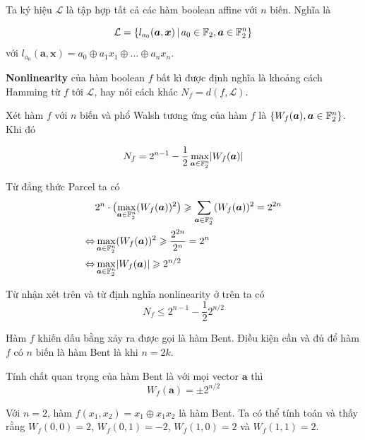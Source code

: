 Ta ký hiệu $\mathcal{L}$ là tập hợp tất cả các hàm boolean affine với $n$ biến. Nghĩa là

\begin{equation}
	\mathcal{L} = \{ l_{a_0} (\bm{a}, \bm{x}) \, | \, a_0 \in \mathbb{F}_2, \bm{a} \in \mathbb{F}_2^n \}
\end{equation}
với $l_{a_0} (\bm{a}, \bm{x}) = a_0 \oplus a_1 x_1 \oplus \ldots \oplus a_n x_n$.

\begin{definition}
	\textbf{Nonlinearity} của hàm boolean $f$ bất kì được định nghĩa là khoảng cách Hamming từ $f$ tới $\mathcal{L}$, hay nói cách khác $N_f = d(f, \mathcal{L})$.
\end{definition}

\begin{remark}
	Xét hàm $f$ với $n$ biến và phổ Walsh tương ứng của hàm $f$ là $\{ W_f (\bm{a}), \bm{a} \in \mathbb{F}_2^n \}$. Khi đó 
	
	\begin{equation}\label{walsh:eq3}
		N_f = 2^{n-1} - \frac{1}{2} \max_{\bm{a} \in \mathbb{F}_2^n} \lvert W_f (\bm{a}) \rvert
	\end{equation}
\end{remark}

\begin{remark}
	Từ đẳng thức Parcel ta có 
	\begin{align*}
		& 2^n \cdot \bigl(\max_{\bm{a} \in \mathbb{F}_2^n} (W_f (\bm{a}))^2\bigr) \geqslant \sum_{\bm{a} \in \mathbb{F}_2^n} (W_f (\bm{a}))^2 = 2^{2n} \\ \Leftrightarrow & \max_{\bm{a} \in \mathbb{F}_2^n} (W_f (\bm{a}))^2 \geqslant \frac{2^{2n}}{2^n} = 2^n \\ \Leftrightarrow & \max_{\bm{a} \in \mathbb{F}_2^n} \lvert W_f (\bm{a}) \rvert \geqslant 2^{n/2}
	\end{align*}
\end{remark}

Từ nhận xét trên và từ định nghĩa nonlinearity ở trên ta có \[N_f \leqslant 2^{n-1} - \frac{1}{2} 2^{n / 2} \]

Hàm $f$ khiến dấu bằng xảy ra được gọi là hàm Bent. Điều kiện cần và đủ để hàm $f$ có $n$ biến là hàm Bent là khi $n = 2k$.

Tính chất quan trọng của hàm Bent là với mọi vector $\bm{a}$ thì \[W_f (\bm{a}) = \pm 2^{n/2}\]

\begin{example}
	Với $n = 2$, hàm $f(x_1, x_2) = x_1 \oplus x_1 x_2$ là hàm Bent. Ta có thể tính toán và thấy rằng $W_f (0, 0) = 2$, $W_f (0, 1) = -2$, $W_f (1, 0) = 2$ và $W_f (1, 1) = 2$.
\end{example}

